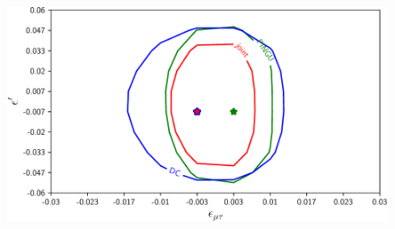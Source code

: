 \documentclass[draft=True]{revtex4-2}
\newcommand{\emm}{\ensuremath{\epsilon_{\mu\mu}}}
\begin{document}
 \begin{figure}[!tb]
    \begin{center}
       \includegraphics[width=0.4\linewidth]{figures/emm_emp_contour.pdf}
    \end{center}
    \caption{}\label{fig:emm_emp_contour}
 \end{figure}

\end{document}
